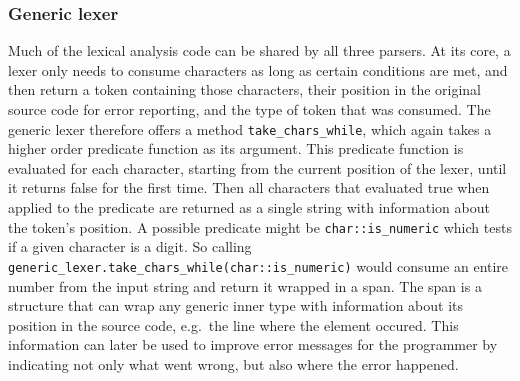\subsubsection{Generic lexer}
Much of the lexical analysis code can be shared by all three parsers.
At its core, a lexer only needs to consume characters as long as certain conditions are met, and then return a token containing those characters, their position in the original source code for error reporting, and the type of token that was consumed.
The generic lexer therefore offers a method \verb+take_chars_while+, which again takes a higher order predicate function as its argument.
This predicate function is evaluated for each character, starting from the current position of the lexer, until it returns false for the first time.
Then all characters that evaluated true when applied to the predicate are returned as a single string with information about the token's position.
A possible predicate might be \verb+char::is_numeric+ which tests if a given character is a digit.
So calling \verb+generic_lexer.take_chars_while(char::is_numeric)+ would consume an entire number from the input string and return it wrapped in a span.
\label{spans}
The span is a structure that can wrap any generic inner type with information about its position in the source code, e.g.\ the line where the element occured.
This information can later be used to improve error messages for the programmer by indicating not only what went wrong, but also where the error happened.


